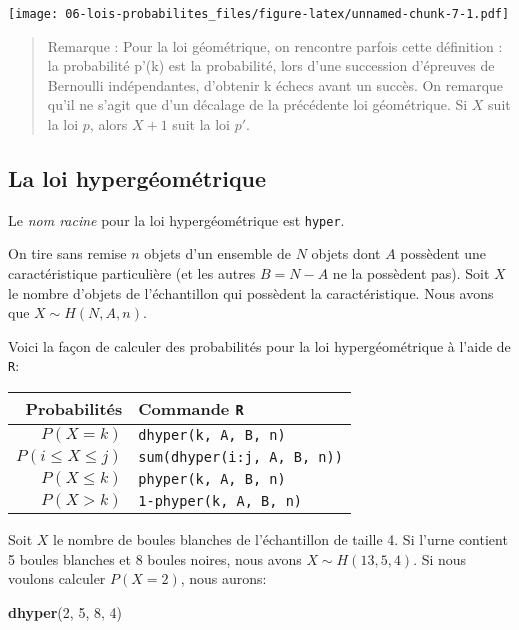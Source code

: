 \documentclass[]{book}
\newenvironment{Shaded}{\begin{snugshade}}{\end{snugshade}}
\newcommand{\KeywordTok}[1]{\textcolor[rgb]{0.13,0.29,0.53}{\textbf{#1}}}
\newcommand{\DecValTok}[1]{\textcolor[rgb]{0.00,0.00,0.81}{#1}}
\newcommand{\NormalTok}[1]{#1}
\begin{document}
\texttt{[image: 06-lois-probabilites\_files/figure-latex/unnamed-chunk-7-1.pdf]}

\begin{quote}
Remarque : Pour la loi géométrique, on rencontre parfois cette
définition : la probabilité p'(k) est la probabilité, lors d'une
succession d'épreuves de Bernoulli indépendantes, d'obtenir k échecs
avant un succès. On remarque qu'il ne s'agit que d'un décalage de la
précédente loi géométrique. Si \(X\) suit la loi \(p\), alors \(X+1\)
suit la loi \(p'\).
\end{quote}

\subsection{La loi hypergéométrique}\label{la-loi-hypergeometrique}

Le \emph{nom racine} pour la loi hypergéométrique est \texttt{hyper}.

On tire sans remise \(n\) objets d'un ensemble de \(N\) objets dont
\(A\) possèdent une caractéristique particulière (et les autres
\(B=N-A\) ne la possèdent pas). Soit \(X\) le nombre d'objets de
l'échantillon qui possèdent la caractéristique. Nous avons que
\(X\sim H(N,A,n)\).

Voici la façon de calculer des probabilités pour la loi hypergéométrique
à l'aide de \texttt{R}:

\begin{longtable}[]{@{}rl@{}}
\toprule
Probabilités & Commande \texttt{R}\tabularnewline
\midrule
\endhead
\(P(X=k)\) & \texttt{dhyper(k,\ A,\ B,\ n)}\tabularnewline
\(P(i\leq X \leq j)\) &
\texttt{sum(dhyper(i:j,\ A,\ B,\ n))}\tabularnewline
\(P(X\leq k)\) & \texttt{phyper(k,\ A,\ B,\ n)}\tabularnewline
\(P(X>k)\) & \texttt{1-phyper(k,\ A,\ B,\ n)}\tabularnewline
\bottomrule
\end{longtable}

Soit \(X\) le nombre de boules blanches de l'échantillon de taille 4. Si
l'urne contient 5 boules blanches et 8 boules noires, nous avons
\(X\sim H(13,5,4)\). Si nous voulons calculer \(P(X=2)\), nous aurons:

\begin{Shaded}
\begin{Highlighting}[]
\KeywordTok{dhyper}\NormalTok{(}\DecValTok{2}\NormalTok{, }\DecValTok{5}\NormalTok{, }\DecValTok{8}\NormalTok{, }\DecValTok{4}\NormalTok{)}
\end{Highlighting}
\end{Shaded}
\end{document}
